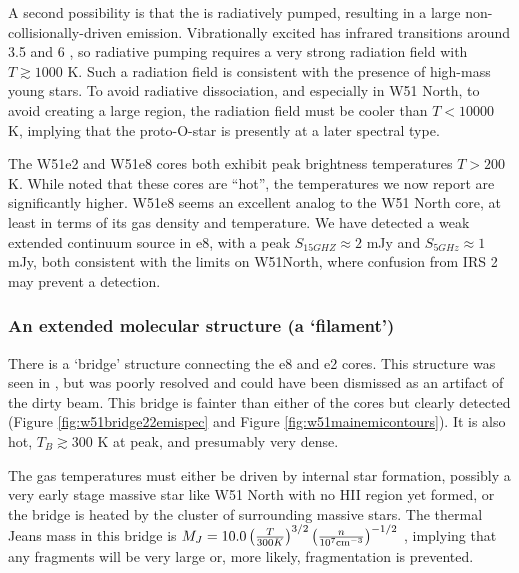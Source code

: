 A second possibility is that the \formaldehyde is radiatively pumped, resulting
in a large non-collisionally-driven emission.  Vibrationally excited
\formaldehyde has infrared
transitions around 3.5 and 6 \um \citep{Al-Refaie2015a}, so radiative pumping
requires a very strong radiation field with $T\gtrsim1000$ K.  Such a radiation
field is consistent with the presence of high-mass young stars.  To avoid
radiative dissociation, and especially in W51 North, to avoid creating a large
\hii region, the radiation field must be cooler than $T < 10000$ K,
implying that the proto-O-star \citep[as inferred from its luminosity and its
kinematically-derived mass][]{Zapata2008a,Zapata2009a} is presently at a later
spectral type.



The W51e2 and W51e8 cores both exhibit peak brightness temperatures $T>200$ K.
While \citet{Zhang1997a} noted that these cores are ``hot'', the temperatures
we now report are significantly higher.  W51e8 seems an excellent analog to the
W51 North core, at least in terms of its gas density and temperature.  We have
detected a weak extended continuum source in e8, with a peak $S_{15 GHZ}
\approx 2$ mJy and $S_{5 GHz} \approx 1$ mJy, both consistent with the limits
on W51North, where confusion from IRS 2 may prevent a detection.

\subsubsection{An extended molecular structure (a `filament')}
There is a `bridge' structure connecting the e8 and e2 cores.  This structure
was seen in \citet{Zhang1997a}, but was poorly resolved and could have been
dismissed as an artifact of the dirty beam.  This bridge is fainter than either
of the cores but clearly detected (Figure \ref{fig:w51bridge22emispec} and
Figure \ref{fig:w51mainemicontours}).  It is also hot, $T_B\gtrsim300$ K at peak,
and presumably very dense.

The gas temperatures must either be driven by internal star formation, possibly
a very early stage massive star like W51 North with no HII region yet formed,
or the bridge is heated by the cluster of surrounding massive stars.  The
thermal Jeans mass in this bridge is $M_J = 10.0 \left(\frac{T}{300
K}\right)^{3/2} \left(\frac{n}{10^7 \textrm{cm}^{-3}}\right)^{-1/2}$ \msun, implying that
any fragments will be very large or, more likely, fragmentation is prevented.

